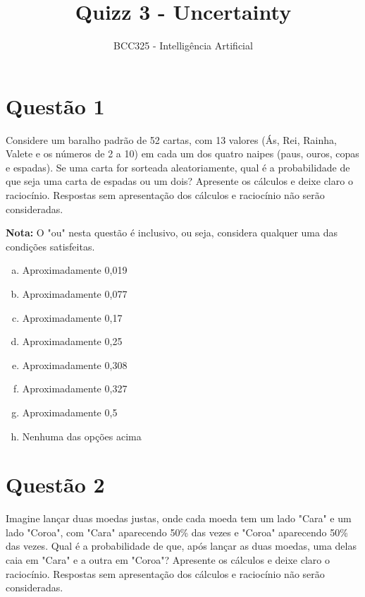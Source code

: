 \documentclass[a4paper,12pt]{article}
\begin{document}
\title{Quizz 3 - Uncertainty}
\author{BCC325 - Intelligência Artificial}
\date{}
\maketitle

\section*{Questão 1}

Considere um baralho padrão de 52 cartas, com 13 valores (Ás, Rei, Rainha, Valete e os números de 2 a 10) em cada um dos quatro naipes (paus, ouros, copas e espadas). Se uma carta for sorteada aleatoriamente, qual é a probabilidade de que seja uma carta de espadas ou um dois? Apresente os cálculos e deixe claro o raciocínio. Respostas sem apresentação dos cálculos e raciocínio não serão consideradas.

\textbf{Nota:} O "ou" nesta questão é inclusivo, ou seja, considera qualquer uma das condições satisfeitas.
    
\begin{multicols}{3}
\begin{enumerate}[a)]
    \item Aproximadamente 0,019
    \item Aproximadamente 0,077
    \item Aproximadamente 0,17
    \item Aproximadamente 0,25
    \item Aproximadamente 0,308
    \item Aproximadamente 0,327
    \item Aproximadamente 0,5
    \item Nenhuma das opções acima
\end{enumerate}
\end{multicols}


\section*{Questão 2}

Imagine lançar duas moedas justas, onde cada moeda tem um lado "Cara" e um lado "Coroa", com "Cara" aparecendo 50\% das vezes e "Coroa" aparecendo 50\% das vezes. Qual é a probabilidade de que, após lançar as duas moedas, uma delas caia em "Cara" e a outra em "Coroa"? Apresente os cálculos e deixe claro o raciocínio. Respostas sem apresentação dos cálculos e raciocínio não serão consideradas.
\end{document}
